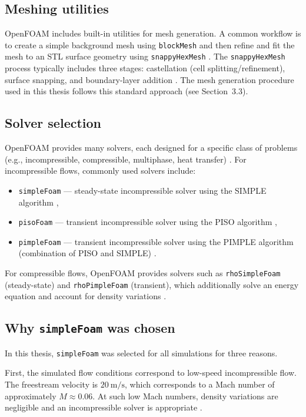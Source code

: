\subsection*{Meshing utilities}
OpenFOAM includes built-in utilities for mesh generation. A common workflow is to create a simple background mesh using \texttt{blockMesh} and then refine and fit the mesh to an STL surface geometry using \texttt{snappyHexMesh} \cite{OpenFOAMUserGuide,OpenFOAMsnappyHexMeshGuide}. The \texttt{snappyHexMesh} process typically includes three stages: castellation (cell splitting/refinement), surface snapping, and boundary-layer addition \cite{OpenFOAMsnappyHexMeshGuide,OpenFOAMsnappyHexMeshV13}. The mesh generation procedure used in this thesis follows this standard approach (see Section~3.3).


\subsection*{Solver selection}
OpenFOAM provides many solvers, each designed for a specific class of problems (e.g., incompressible, compressible, multiphase, heat transfer) \cite{OpenFOAMUserGuide}. For incompressible flows, commonly used solvers include:
\begin{itemize}
    \item \texttt{simpleFoam} --- steady-state incompressible solver using the SIMPLE algorithm \cite{OpenFOAMsimpleFoamGuide},
    \item \texttt{pisoFoam} --- transient incompressible solver using the PISO algorithm \cite{OpenFOAMUserGuide},
    \item \texttt{pimpleFoam} --- transient incompressible solver using the PIMPLE algorithm (combination of PISO and SIMPLE) \cite{OpenFOAMUserGuide}.
\end{itemize}
For compressible flows, OpenFOAM provides solvers such as \texttt{rhoSimpleFoam} (steady-state) and \texttt{rhoPimpleFoam} (transient), which additionally solve an energy equation and account for density variations \cite{OpenFOAMUserGuide}.

\subsection*{Why \texttt{simpleFoam} was chosen}
In this thesis, \texttt{simpleFoam} was selected for all simulations for three reasons.

First, the simulated flow conditions correspond to low-speed incompressible flow. The freestream velocity is $20~\mathrm{m/s}$, which corresponds to a Mach number of approximately $M \approx 0.06$. At such low Mach numbers, density variations are negligible and an incompressible solver is appropriate \cite{VersteegMalalasekera2007CFD}.

